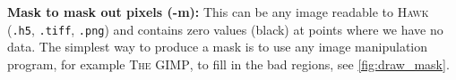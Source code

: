 \documentclass[11pt,a4paper]{article}
\newcommand{\hawk}[1]{\textsc{#1}}
\newcommand{\program}[1]{\textsc{#1}}
\newcommand{\com}[1]{\texttt{#1}}
\begin{document}
\textbf{Mask to mask out pixels (-m):} This can be any image readable to \hawk{Hawk} (\com{.h5}, \com{.tiff}, \com{.png}) and contains zero values (black) at points where we have no data. The simplest way to produce a mask is to use any image manipulation program, for example \program{The GIMP}, to fill in the bad regions, see \ref{fig:draw_mask}.
\begin{figure}
\centering
\mbox{\hspace{-0.1\textwidth}
  }

\end{figure}
\end{document}
